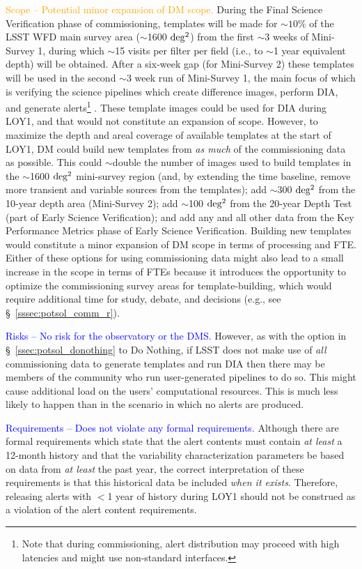 \documentclass[DM,lsstdraft,toc]{lsstdoc}
\begin{document}
\textcolor{orange}{ Scope -- Potential minor expansion of DM scope.}
During the Final Science Verification phase of commissioning, templates will be made for $\sim10\%$ of the LSST WFD main survey area ($\sim$1600 $\rm deg^2$) from the first $\sim$3 weeks of Mini-Survey 1, during which $\sim$15 visits per filter per field (i.e., to $\sim$1 year equivalent depth) will be obtained.
After a six-week gap (for Mini-Survey 2) these templates will be used in the second $\sim$3 week run of Mini-Survey 1, the main focus of which is verifying the science pipelines which create difference images, perform DIA, and generate alerts\footnote{Note that during commissioning, alert distribution may proceed with high latencies and might use non-standard interfaces.} .
These template images could be used for DIA during LOY1, and that would not constitute an expansion of scope.
However, to maximize the depth and areal coverage of available templates at the start of LOY1, DM could build new templates from {\em as much} of the commissioning data as possible.
This could $\sim$double the number of images used to build templates in the $\sim$1600 $\rm deg^2$ mini-survey region (and, by extending the time baseline, remove more transient and variable sources from the templates); add $\sim$300 $\rm deg^2$ from the 10-year depth area (Mini-Survey 2); add $\sim$100 $\rm deg^2$ from the 20-year Depth Test (part of Early Science Verification); and add any and all other data from the Key Performance Metrics phase of Early Science Verification.
Building new templates would constitute a minor expansion of DM scope in terms of processing and FTE.
Either of these options for using commissioning data might also lead to a small increase in the scope in terms of FTEs because it introduces the opportunity to optimize the commissioning survey areas for template-building, which would require additional time for study, debate, and decisions (e.g., see \S~\ref{sssec:potsol_comm_r}).

\textcolor{blue}{ Risks -- No risk for the observatory or the DMS.}
However, as with the option in \S~\ref{ssec:potsol_donothing} to Do Nothing, if LSST does not make use of {\em all} commissioning data to generate templates and run DIA then there may be members of the community who run user-generated pipelines to do so.
This might cause additional load on the users' computational resources.
This is much less likely to happen than in the scenario in which no alerts are produced.

\textcolor{blue}{ Requirements -- Does not violate any formal requirements.}
Although there are formal requirements which state that the alert contents must contain {\em at least} a 12-month history and that the variability characterization parameters be based on data from {\em at least} the past year, the correct interpretation of these requirements is that this historical data be included {\em when it exists}.
Therefore, releasing alerts with $<$1 year of history during LOY1 should not be construed as a violation of the alert content requirements.
\end{document}
